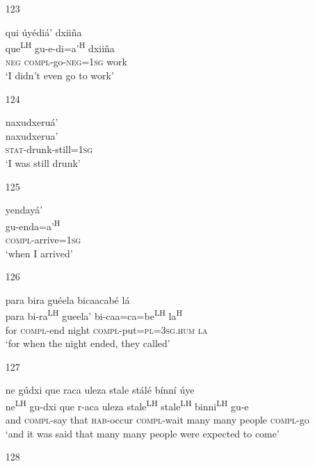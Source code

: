 \begin{itemize}
\item[123]
 
\glll  qui \'{u}y\'{e}di\'{a}' dxii\~{n}a \\ 
que\textsuperscript{LH} gu-e-di=a'\textsuperscript{H} dxii\~{n}a \\ 
\textsc{neg} \textsc{compl}-go-\textsc{neg}=\textsc{1sg} work\\
\glt `I didn't even go to work'
 


\item[124]
 
\glll   naxudxeru\'{a}' \\
naxudxerua'\\
  \textsc{stat}-drunk-still=\textsc{1sg}\\
\glt `I was still drunk'
 


\item[125]
 
\glll   yenday\'{a}' \\ 
gu-enda=a'\textsuperscript{H}\\
  \textsc{compl}-arrive=\textsc{1sg}\\
\glt `when I arrived'
 


\item[126]
  
\glll   para bira gu\'{e}ela bicaacab\'{e} l\'{a} \\
para bi-ra\textsuperscript{LH} gueela' bi-caa=ca=be\textsuperscript{LH} la\textsuperscript{H}\\
for \textsc{compl}-end night \textsc{compl}-put=\textsc{pl}=\textsc{3sg.hum} \textsc{la}\\
\glt `for when the night ended, they called'
 


\item[127]
 
\glll  ne g\'{u}dxi que raca uleza stale st\'{a}l\'{e} b\'{i}nn\'{i} \'{u}ye\\
ne\textsuperscript{LH} gu-dxi que r-aca uleza stale\textsuperscript{LH} stale\textsuperscript{LH} binni\textsuperscript{LH} gu-e\\
and \textsc{compl}-say that \textsc{hab}-occur \textsc{compl}-wait many many people \textsc{compl}-go\\
\glt `and it was said that many many people were expected to come'
 



\item[128]
 

\end{itemize}
